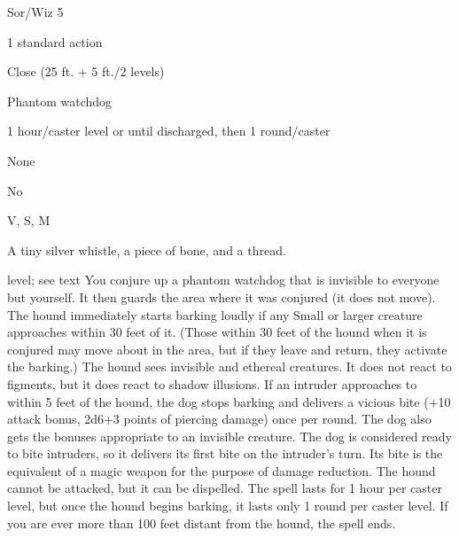 
\begin{description*}
\item[Level:] Sor/Wiz 5
\item[Casting Time:] 1 standard action
\item[Range:] Close (25 ft. + 5 ft./2 levels)
\item[Effect:] Phantom watchdog
\item[Duration:] 1 hour/caster level or until discharged, then 1 round/caster
\item[Saving Throw:] None
\item[Spell Resistance:] No
\item[Components:] V, S, M
\item[Arcane Material Component:] A tiny silver whistle, a piece of bone, and a thread.
\end{description*}

level; see text
You conjure up a phantom watchdog that is invisible to everyone but yourself. It
then guards the area where it was conjured (it does not move). The hound immediately
starts barking loudly if any Small or larger creature approaches within 30 feet
of it. (Those within 30 feet of the hound when it is conjured may move about in
the area, but if they leave and return, they activate the barking.) The hound sees
invisible and ethereal creatures. It does not react to figments, but it does react
to shadow illusions.
If an intruder approaches to within 5 feet of the hound, the dog stops barking
and delivers a vicious bite (+10 attack bonus, 2d6+3 points of piercing damage)
once per round. The dog also gets the bonuses appropriate to an invisible creature.
The dog is considered ready to bite intruders, so it delivers its first bite on
the intruder's turn. Its bite is the equivalent of a magic weapon for the purpose
of damage reduction. The hound cannot be attacked, but it can be dispelled.
The spell lasts for 1 hour per caster level, but once the hound begins barking,
it lasts only 1 round per caster level. If you are ever more than 100 feet distant
from the hound, the spell ends.